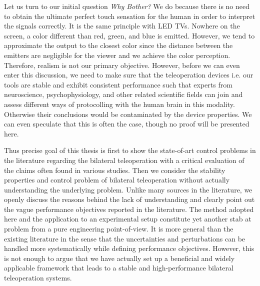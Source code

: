 Let us turn to our initial question \emph{Why Bother?} We do because there is no need to obtain the ultimate perfect touch sensation for the human in order to interpret the signals correctly. It is the same principle with LED TVs. Nowhere on the screen, a color different than red, green, and blue is emitted. However, we tend to approximate the output to the closest color since the distance between the emitters are negligible for the viewer and we achieve the color perception. Therefore, realism is not our primary objective. However, before we can even enter this discussion, we need to make sure that the teleoperation devices i.e. our tools are stable and exhibit consistent performance such that experts from neuroscience, psychophysiology, and other related scientific fields can join and assess different ways of protocolling with the human brain in this modality. Otherwise their conclusions would be contaminated by the device properties. We can even speculate that this is often the case, though no proof will be presented here.  


Thus precise goal of this thesis is first to show the state-of-art control problems in the literature regarding the bilateral teleoperation with a critical evaluation of the claims often found in various studies. Then we consider the stability properties and control problem of bilateral teleoperation without actually understanding the underlying problem. Unlike many sources in the literature, we openly discuss the reasons behind the lack of understanding and clearly point out the vague performance objectives reported in the literature. The method adopted here and the application to an experimental setup constitute yet another stab at problem from a pure engineering point-of-view. It is more general than the existing literature in the sense that the uncertainties and perturbations can be handled more systematically while defining performance objectives. However, this is not enough to argue that we have actually set up a beneficial and widely applicable framework that leads to a stable and high-performance bilateral teleoperation systems.
